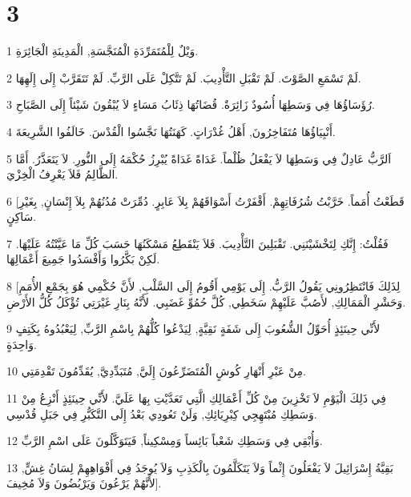 \chapter{3}

\par 1 وَيْلٌ لِلْمُتَمَرِّدَةِ الْمُنَجَّسَةِ, الْمَدِينَةِ الْجَائِرَةِ.
\par 2 لَمْ تَسْمَعِ الصَّوْتَ. لَمْ تَقْبَلِ التَّأْدِيبَ. لَمْ تَتَّكِلْ عَلَى الرَّبِّ. لَمْ تَتَقَرَّبْ إِلَى إِلَهِهَا.
\par 3 رُؤَسَاؤُهَا فِي وَسَطِهَا أُسُودٌ زَائِرَةٌ. قُضَاتُهَا ذِئَابُ مَسَاءٍ لاَ يُبْقُونَ شَيْئاً إِلَى الصَّبَاحِ.
\par 4 أَنْبِيَاؤُهَا مُتَفَاخِرُونَ, أَهْلُ غُدْرَاتٍ. كَهَنَتُهَا نَجَّسُوا الْقُدْسَ. خَالَفُوا الشَّرِيعَةَ.
\par 5 اَلرَّبُّ عَادِلٌ فِي وَسَطِهَا لاَ يَفْعَلُ ظُلْماً. غَدَاةً غَدَاةً يُبْرِزُ حُكْمَهُ إِلَى النُّورِ. لاَ يَتَعَذَّرُ. أَمَّا الظَّالِمُ فَلاَ يَعْرِفُ الْخِزْيَ.
\par 6 [قَطَعْتُ أُمَماً. خَرَّبْتُ شُرُفَاتِهِمْ. أَقْفَرْتُ أَسْوَاقَهُمْ بِلاَ عَابِرٍ. دُمِّرَتْ مُدُنُهُمْ بِلاَ إِنْسَانٍ, بِغَيْرِ سَاكِنٍ.
\par 7 فَقُلْتُ: إِنَّكِ لِتَخْشَيْنَنِي. تَقْبَلِينَ التَّأْدِيبَ. فَلاَ يَنْقَطِعُ مَسْكَنُهَا حَسَبَ كُلِّ مَا عَيَّنْتُهُ عَلَيْهَا. لَكِنْ بَكَّرُوا وَأَفْسَدُوا جَمِيعَ أَعْمَالِهَا.
\par 8 [لِذَلِكَ فَانْتَظِرُونِي يَقُولُ الرَّبُّ. إِلَى يَوْمِي أَقُومُ إِلَى السَّلْبِ, لأَنَّ حُكْمِي هُوَ بِجَمْعِ الأُمَمِ وَحَشْرِ الْمَمَالِكِ, لأَصُبَّ عَلَيْهِمْ سَخَطِي, كُلَّ حُمُوِّ غَضَبِي. لأَنَّهُ بِنَارِ غَيْرَتِي تُؤْكَلُ كُلُّ الأَرْضِ.
\par 9 لأَنِّي حِينَئِذٍ أُحَوِّلُ الشُّعُوبَ إِلَى شَفَةٍ نَقِيَّةٍ, لِيَدْعُوا كُلُّهُمْ بِاسْمِ الرَّبِّ, لِيَعْبُدُوهُ بِكَتِفٍ وَاحِدَةٍ.
\par 10 مِنْ عَبْرِ أَنْهَارِ كُوشٍ الْمُتَضَرِّعُونَ إِلَيَّ, مُتَبَدِّدِيَّ, يُقَدِّمُونَ تَقْدِمَتِي.
\par 11 فِي ذَلِكَ الْيَوْمِ لاَ تَخْزِينَ مِنْ كُلِّ أَعْمَالِكِ الَّتِي تَعَدَّيْتِ بِهَا عَلَيَّ. لأَنِّي حِينَئِذٍ أَنْزِعُ مِنْ وَسَطِكِ مُبْتَهِجِي كِبْرِيَائِكِ, وَلَنْ تَعُودِي بَعْدُ إِلَى التَّكَبُّرِ فِي جَبَلِ قُدْسِي.
\par 12 وَأُبْقِي فِي وَسَطِكِ شَعْباً بَائِساً وَمِسْكِيناً, فَيَتَوَكَّلُونَ عَلَى اسْمِ الرَّبِّ.
\par 13 بَقِيَّةُ إِسْرَائِيلَ لاَ يَفْعَلُونَ إِثْماً وَلاَ يَتَكَلَّمُونَ بِالْكَذِبِ وَلاَ يُوجَدُ فِي أَفْوَاهِهِمْ لِسَانُ غِشٍّ, لأَنَّهُمْ يَرْعُونَ وَيَرْبُضُونَ وَلاَ مُخِيفَ].

